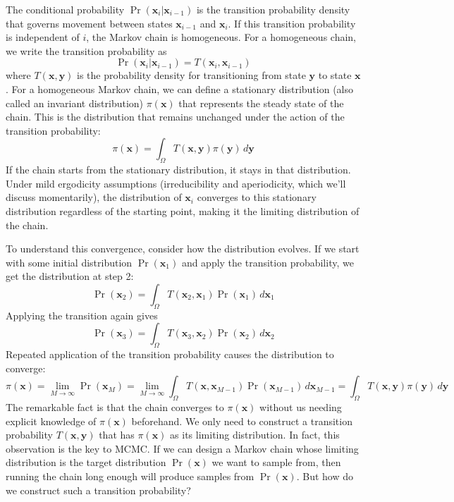 The conditional probability $\Pr(\mathbf{x}_i|\mathbf{x}_{i-1})$ is the transition probability density that governs movement between states $\mathbf{x}_{i-1}$ and $\mathbf{x}_i$. If this transition probability is independent of $i$, the Markov chain is homogeneous. For a homogeneous chain, we write the transition probability as
\begin{equation}
    \Pr(\mathbf{x}_i|\mathbf{x}_{i-1}) = T(\mathbf{x}_i, \mathbf{x}_{i-1})
\end{equation}
where $T(\mathbf{x}, \mathbf{y})$ is the probability density for transitioning from state $\mathbf{y}$ to state $\mathbf{x}$. For a homogeneous Markov chain, we can define a stationary distribution (also called an invariant distribution) $\pi(\mathbf{x})$ that represents the steady state of the chain. This is the distribution that remains unchanged under the action of the transition probability:
\begin{equation}
    \pi(\mathbf{x}) = \int_{\Omega} T(\mathbf{x}, \mathbf{y}) \pi(\mathbf{y}) \, d\mathbf{y}
\end{equation}
If the chain starts from the stationary distribution, it stays in that distribution. Under mild ergodicity assumptions (irreducibility and aperiodicity, which we'll discuss momentarily), the distribution of $\mathbf{x}_i$ converges to this stationary distribution regardless of the starting point, making it the limiting distribution of the chain.

To understand this convergence, consider how the distribution evolves. If we start with some initial distribution $\Pr(\mathbf{x}_1)$ and apply the transition probability, we get the distribution at step 2:
\begin{equation}
    \Pr(\mathbf{x}_2) = \int_{\Omega} T(\mathbf{x}_2, \mathbf{x}_1) \Pr(\mathbf{x}_1) \, d\mathbf{x}_1
\end{equation}
Applying the transition again gives
\begin{equation}
    \Pr(\mathbf{x}_3) = \int_{\Omega} T(\mathbf{x}_3, \mathbf{x}_2) \Pr(\mathbf{x}_2) \, d\mathbf{x}_2
\end{equation}
Repeated application of the transition probability causes the distribution to converge:
\begin{equation}
    \pi(\mathbf{x}) = \lim_{M \to \infty} \Pr(\mathbf{x}_M) = \lim_{M \to \infty} \int_{\Omega} T(\mathbf{x}, \mathbf{x}_{M-1}) \Pr(\mathbf{x}_{M-1}) \, d\mathbf{x}_{M-1} = \int_{\Omega} T(\mathbf{x}, \mathbf{y}) \pi(\mathbf{y}) \, d\mathbf{y}
\end{equation}
The remarkable fact is that the chain converges to $\pi(\mathbf{x})$ without us needing explicit knowledge of $\pi(\mathbf{x})$ beforehand. We only need to construct a transition probability $T(\mathbf{x}, \mathbf{y})$ that has $\pi(\mathbf{x})$ as its limiting distribution. In fact, this observation is the key to MCMC. If we can design a Markov chain whose limiting distribution is the target distribution $\Pr(\mathbf{x})$ we want to sample from, then running the chain long enough will produce samples from $\Pr(\mathbf{x})$. But how do we construct such a transition probability?


